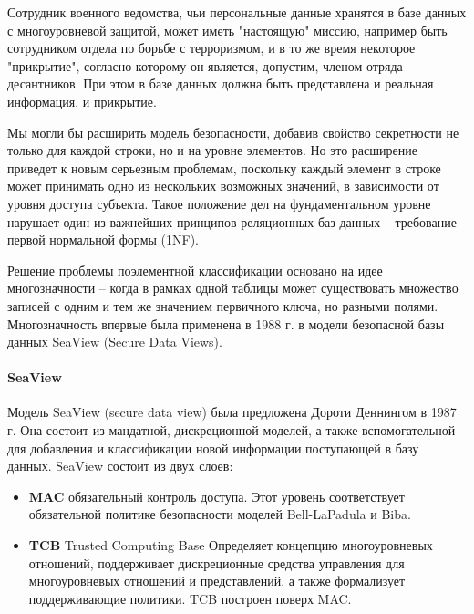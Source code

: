Сотрудник военного ведомства, чьи персональные данные хранятся в базе данных с многоуровневой защитой, может иметь "настоящую" миссию, например быть сотрудником отдела по борьбе с терроризмом, и в то же время некоторое "прикрытие", согласно которому он является, допустим, членом отряда десантников. При этом в базе данных должна быть представлена и реальная информация, и прикрытие. 

Мы могли бы расширить модель безопасности, добавив свойство секретности не только для каждой строки, но и на уровне элементов. Но это расширение приведет к новым серьезным проблемам, поскольку каждый элемент в строке может принимать одно из нескольких возможных значений, в зависимости от уровня доступа субъекта. Такое положение дел на фундаментальном уровне нарушает один из важнейших принципов реляционных баз данных – требование первой нормальной формы (1NF)\footnotemark. 


Решение проблемы поэлементной классификации основано на идее многозначности --  когда в рамках одной таблицы может существовать множество записей с одним и тем же значением первичного ключа, но разными полями.  Многозначность впервые была применена в 1988 г. в модели безопасной базы данных SeaView (Secure Data Views).  

\paragraph{SeaView}

Модель SeaView (secure data view) была предложена Дороти Деннингом в 1987 г. Она состоит из мандатной, дискреционной моделей, а также вспомогательной для добавления и классификации новой информации поступающей в базу данных. SeaView состоит из двух слоев:

\begin{itemize}
    \item \textbf{MAC}
    обязательный контроль доступа. Этот уровень соответствует обязательной политике безопасности моделей Bell-LaPadula и Biba.
    \item \textbf{TCB}
    Trusted Computing Base Определяет концепцию многоуровневых отношений, поддерживает дискреционные средства управления для многоуровневых отношений и представлений, а также формализует поддерживающие политики. TCB построен поверх MAC.
\end{itemize}

